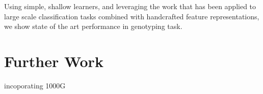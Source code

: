 \documentclass{article}
\begin{document}
Using simple, shallow learners, and leveraging the work that has been applied to large scale classification tasks combined with handcrafted feature representations, we show state of the art performance in genotyping task.



\section{Further Work}
incoporating 1000G




\small



\end{document}
